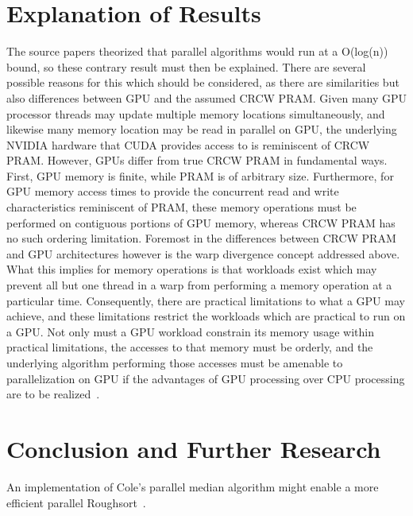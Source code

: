 \documentclass[letterpaper, 12pt]{article}
\let\supercite\cite
\renewcommand{\cite}[1]{\textnormal{~\supercite{#1}}}
\begin{document}
\begin{sidewaysfigure}

\vspace{-4ex}
\caption{\label{fig:n1250k}{\em
  Sort Runtimes over Arrays of Radius $k$, $n = 1.25\cdot 10^6$
}}
\end{sidewaysfigure}

\clearpage
\section{Explanation of Results}
  The source papers theorized that parallel algorithms would run at a O(log(n)) bound, so these contrary result must then be explained.  There are several possible reasons for this which should be considered, as there are similarities but also differences between GPU and the assumed CRCW PRAM.  Given many GPU processor threads may update multiple memory locations simultaneously, and likewise many memory location may be read in parallel on GPU, the underlying NVIDIA hardware that CUDA provides access to is reminiscent of CRCW PRAM.  However, GPUs differ from true CRCW PRAM in fundamental ways.  First, GPU memory is finite, while PRAM is of arbitrary size.  Furthermore, for GPU memory access times to provide the concurrent read and write characteristics reminiscent of PRAM, these memory operations must be performed on contiguous portions of GPU memory, whereas CRCW PRAM has no such ordering limitation.  Foremost in the differences between CRCW PRAM and GPU architectures however is the warp divergence concept addressed above.  What this implies for memory operations is that workloads exist which may prevent all but one thread in a warp from performing a memory operation at a particular time.  Consequently, there are practical limitations to what a GPU may achieve, and these limitations restrict the workloads which are practical to run on a GPU.  Not only must a GPU workload constrain its memory usage within practical limitations, the accesses to that memory must be orderly, and the underlying algorithm performing those accesses must be amenable to parallelization on GPU if the advantages of GPU processing over CPU processing are to be realized\cite{dehne2010exploring}. 

\section{Conclusion and Further Research}
An implementation of Cole's parallel median algorithm might enable a more efficient parallel Roughsort\cite{cole85}.

\clearpage

\nocite{*}
\end{document}
